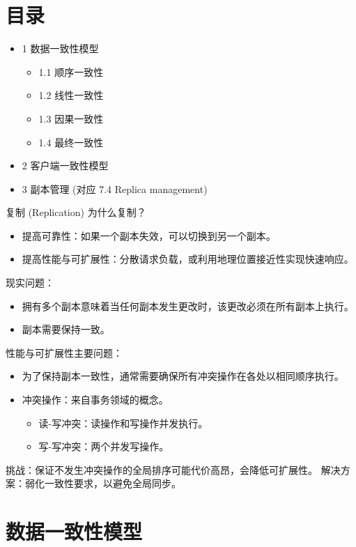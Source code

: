 \section{目录}

\begin{itemize}
\item 1 数据一致性模型
  \begin{itemize}
  \item 1.1 顺序一致性
  \item 1.2 线性一致性
  \item 1.3 因果一致性
  \item 1.4 最终一致性
  \end{itemize}
\item 2 客户端一致性模型
\item 3 副本管理 (对应 7.4 Replica management)
\end{itemize}

复制 (Replication) 为什么复制？
\begin{itemize}
\item 提高可靠性：如果一个副本失效，可以切换到另一个副本。
\item 提高性能与可扩展性：分散请求负载，或利用地理位置接近性实现快速响应。
\end{itemize}

现实问题：
\begin{itemize}
\item 拥有多个副本意味着当任何副本发生更改时，该更改必须在所有副本上执行。
\item 副本需要保持一致。
\end{itemize}

性能与可扩展性主要问题：
\begin{itemize}
\item 为了保持副本一致性，通常需要确保所有冲突操作在各处以相同顺序执行。
\item 冲突操作：来自事务领域的概念。
  \begin{itemize}
  \item 读-写冲突：读操作和写操作并发执行。
  \item 写-写冲突：两个并发写操作。
  \end{itemize}
\end{itemize}

挑战：保证不发生冲突操作的全局排序可能代价高昂，会降低可扩展性。
解决方案：弱化一致性要求，以避免全局同步。

\section{数据一致性模型}


